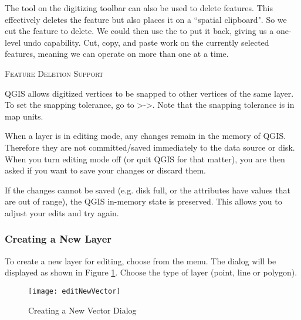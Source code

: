 The  tool on the digitizing toolbar can
also be used to delete features. This effectively deletes the feature but
also places it on a ``spatial clipboard". So we cut the feature to delete. 
We could then use the  to put it back, giving us a one-level undo 
capability. Cut, copy, and paste work on the currently selected features, 
meaning we can operate on more than one at a time.

\begin{Tip}[ht]\caption{\textsc{Feature Deletion Support}}
\end{Tip}

QGIS allows digitized vertices to be snapped to other vertices of the same layer. To 
set the snapping tolerance, go to
>->.
Note that the snapping tolerance is in map units.


When a layer is in editing mode, any changes remain in the memory of QGIS.
Therefore they are not committed/saved immediately to the data source or disk.
When you turn editing mode off (or quit QGIS for that matter), 
you are then asked if you want to save your
changes or discard them.

If the changes cannot be saved (e.g. disk full, or the attributes have
values that are out of range), the QGIS in-memory state is preserved.  This
allows you to adjust your edits and try again.

\subsubsection{Creating a New Layer}\label{sec:create shape}

To create a new layer for editing, choose  from the
 menu. 
The  dialog will be displayed as
shown in Figure \ref{fig:newvectorlayer}. Choose the type of layer (point,
line or polygon).

\begin{figure}[ht]
   \begin{center}
   \caption{Creating a New Vector Dialog}\label{fig:newvectorlayer}\smallskip
   \texttt{[image: editNewVector]}
\end{center} 
\end{figure}

